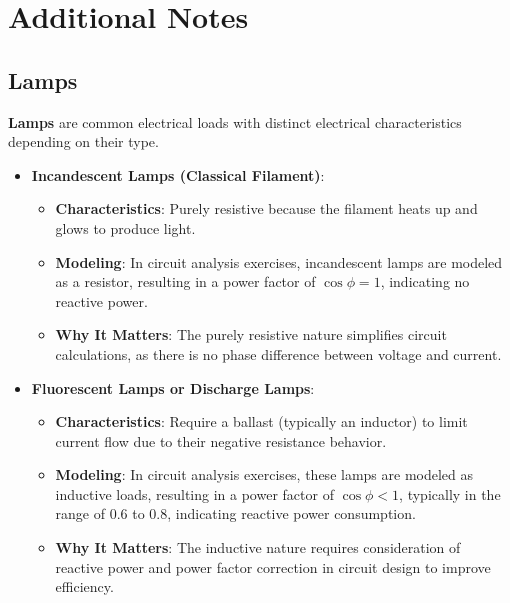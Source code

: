 \documentclass[12pt]{article}
\newcommand{\concept}[1]{\textbf{#1}}
\begin{document}
\section{Additional Notes}
\subsection{Lamps}
\concept{Lamps} are common electrical loads with distinct electrical characteristics depending on their type.
\begin{itemize}
    \item \textbf{Incandescent Lamps (Classical Filament)}:
        \begin{itemize}
            \item \textbf{Characteristics}: Purely resistive because the filament heats up and glows to produce light.
            \item \textbf{Modeling}: In circuit analysis exercises, incandescent lamps are modeled as a resistor, resulting in a power factor of \(\cos \phi = 1\), indicating no reactive power.
            \item \textbf{Why It Matters}: The purely resistive nature simplifies circuit calculations, as there is no phase difference between voltage and current.
        \end{itemize}
    \item \textbf{Fluorescent Lamps or Discharge Lamps}:
        \begin{itemize}
            \item \textbf{Characteristics}: Require a ballast (typically an inductor) to limit current flow due to their negative resistance behavior.
            \item \textbf{Modeling}: In circuit analysis exercises, these lamps are modeled as inductive loads, resulting in a power factor of \(\cos \phi < 1\), typically in the range of 0.6 to 0.8, indicating reactive power consumption.
            \item \textbf{Why It Matters}: The inductive nature requires consideration of reactive power and power factor correction in circuit design to improve efficiency.
        \end{itemize}
\end{itemize}
\end{document}
